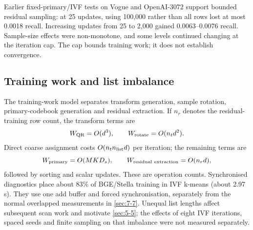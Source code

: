 Earlier fixed-primary/IVF tests on Vogue and OpenAI-3072 support bounded
residual sampling: at 25 updates, using 100,000 rather than all rows
lost at most 0.0018 recall. Increasing updates from 25 to 2,000 gained
0.0063--0.0076 recall. Sample-size effects were non-monotone, and some
levels continued changing at the iteration cap. The cap bounds training
work; it does not establish convergence.

\subsection{Training work and list imbalance}

The training-work model separates transform generation, sample rotation,
primary-codebook generation and residual extraction. If $n_r$ denotes
the residual-training row count, the transform terms are
\[
 W_{\rm QR}=O(d^3),\qquad W_{\rm rotate}=O(n_t d^2).
\]
Direct coarse assignment costs $O(n_t n_{\rm list}d)$ per iteration;
the remaining terms are
\[
 W_{\rm primary}=O(MKD_s),\qquad
 W_{\rm residual\ extraction}=O(n_rd),
\]
followed by sorting and scalar updates. These are operation counts.
Synchronised diagnostics place about 83\% of BGE/Stella training in IVF
k-means (about 2.97\,s). They use one add buffer and forced
synchronisation, separately from the normal overlapped measurements in
\cref{sec:7-7}. Unequal list lengths affect subsequent scan work and
motivate \cref{sec:5-5}; the effects of eight IVF iterations, spaced seeds
and finite sampling on that imbalance were not measured separately.
